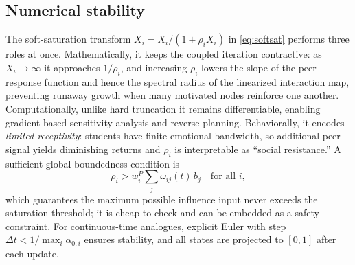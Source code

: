 \documentclass[11pt]{article}
\begin{document}
\subsection{Numerical stability}\label{sec:stability}
The soft-saturation transform $\tilde X_i=X_i/(1+\rho_i X_i)$ in \eqref{eq:softsat} performs three roles at once. Mathematically, it keeps the coupled iteration contractive: as $X_i\to\infty$ it approaches $1/\rho_i$, and increasing $\rho_i$ lowers the slope of the peer-response function and hence the spectral radius of the linearized interaction map, preventing runaway growth when many motivated nodes reinforce one another. Computationally, unlike hard truncation it remains differentiable, enabling gradient-based sensitivity analysis and reverse planning. Behaviorally, it encodes \emph{limited receptivity}: students have finite emotional bandwidth, so additional peer signal yields diminishing returns and $\rho_i$ is interpretable as ``social resistance.'' A sufficient global-boundedness condition is
\begin{equation*}
\rho_i > w^{P}_i\textstyle\sum_j \omega_{ij}(t)\,b_j\quad\text{for all }i,
\end{equation*}
which guarantees the maximum possible influence input never exceeds the saturation threshold; it is cheap to check and can be embedded as a safety constraint. For continuous-time analogues, explicit Euler with step $\Delta t<1/\max_i\alpha_{0,i}$ ensures stability, and all states are projected to $[0,1]$ after each update.
\end{document}
